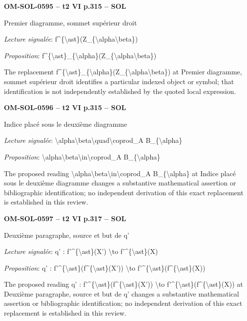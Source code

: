 \par\noindent\textbf{OM-SOL-0595 -- t2 VI p.315 -- SOL}\par
Premier diagramme, sommet supérieur droit\par
\emph{Lecture signalée}: f\textasciicircum{}\{\textbackslash{}ast\}(Z\_\{\textbackslash{}alpha\textbackslash{}beta\})\par
\emph{Proposition}: f\textasciicircum{}\{\textbackslash{}ast\}\_\{\textbackslash{}alpha\}(Z\_\{\textbackslash{}alpha\textbackslash{}beta\})\par
The replacement f\textasciicircum{}\{\textbackslash{}ast\}\_\{\textbackslash{}alpha\}(Z\_\{\textbackslash{}alpha\textbackslash{}beta\}) at Premier diagramme, sommet supérieur droit identifies a particular indexed object or symbol; that identification is not independently established by the quoted local expression.\par
\par\noindent\textbf{OM-SOL-0596 -- t2 VI p.315 -- SOL}\par
Indice placé sous le deuxième diagramme\par
\emph{Lecture signalée}: \textbackslash{}alpha\textbackslash{}beta\textbackslash{}quad\textbackslash{}coprod\_A B\_\{\textbackslash{}alpha\}\par
\emph{Proposition}: \textbackslash{}alpha\textbackslash{}beta\textbackslash{}in\textbackslash{}coprod\_A B\_\{\textbackslash{}alpha\}\par
The proposed reading \textbackslash{}alpha\textbackslash{}beta\textbackslash{}in\textbackslash{}coprod\_A B\_\{\textbackslash{}alpha\} at Indice placé sous le deuxième diagramme changes a substantive mathematical assertion or bibliographic identification; no independent derivation of this exact replacement is established in this review.\par
\par\noindent\textbf{OM-SOL-0597 -- t2 VI p.317 -- SOL}\par
Deuxième paragraphe, source et but de q'\par
\emph{Lecture signalée}: q' : f'\textasciicircum{}\{\textbackslash{}ast\}(X') \textbackslash{}to f'\textasciicircum{}\{\textbackslash{}ast\}(X)\par
\emph{Proposition}: q' : f'\textasciicircum{}\{\textbackslash{}ast\}(f\textasciicircum{}\{\textbackslash{}ast\}(X')) \textbackslash{}to f'\textasciicircum{}\{\textbackslash{}ast\}(f\textasciicircum{}\{\textbackslash{}ast\}(X))\par
The proposed reading q' : f'\textasciicircum{}\{\textbackslash{}ast\}(f\textasciicircum{}\{\textbackslash{}ast\}(X')) \textbackslash{}to f'\textasciicircum{}\{\textbackslash{}ast\}(f\textasciicircum{}\{\textbackslash{}ast\}(X)) at Deuxième paragraphe, source et but de q' changes a substantive mathematical assertion or bibliographic identification; no independent derivation of this exact replacement is established in this review.\par
